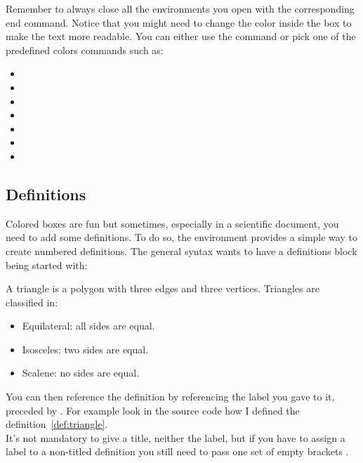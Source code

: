 \documentclass[../main.tex]{subfiles}
\begin{document}
Remember to always close all the environments you open with the corresponding
end command.
Notice that you might need to change the color inside the box to make the text
more readable. You can either use the command  or pick one of the
predefined colors commands such as:

\begin{itemize}
	\item {}
	\item  {}
	\item {}
	\item {}
	\item {}
	\item {}
	\item {}
\end{itemize}

\pagebreak
\subsection{Definitions}

Colored boxes are fun but sometimes, especially in a scientific document, you
need to add some definitions. To do so, the  environment provides
a simple way to create numbered definitions. The general syntax wants to have a
definitions block being started with:

\begin{center}
\end{center}

\begin{definition}[Triangle][triangle]
    A triangle is a polygon with three edges and three vertices. Triangles are classified in:
	\begin{itemize}
		\item Equilateral: all sides are equal.
		\item Isosceles: two sides are equal.
		\item Scalene: no sides are equal.
	\end{itemize}
\end{definition}

You can then reference the definition by referencing the label you gave to it,
preceded by . For example look in the source code how I defined the
definition~\ref{def:triangle}.\\
It's not mandatory to give a title, neither the label, but if you have to assign a label to a non-titled definition you still need to pass one set of empty brackets .
\end{document}
